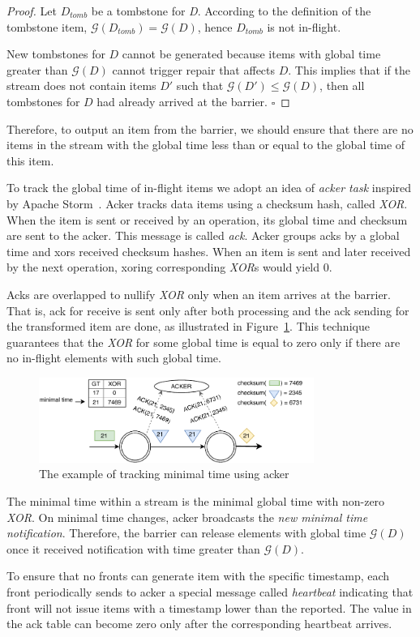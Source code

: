 \begin{proof}
  Let $D_{tomb}$ be a tombstone for {\it D}. According to the definition of the tombstone item, $\mathcal{G} (D_{tomb}) = \mathcal{G} (D)$, hence $D_{tomb}$ is not in-flight.
  
  New tombstones for $D$ cannot be generated because items with global time greater than $\mathcal{G} (D)$ cannot trigger repair that affects $D$. This implies that if the stream does not contain items $D\prime$ such that $\mathcal{G} (D\prime) \le \mathcal{G} (D)$, then all tombstones for $D$ had already arrived at the barrier. $\square$
\end{proof}

Therefore, to output an item from the barrier, we should ensure that there are no items in the stream with the global time less than or equal to the global time of this item.

To track the global time of in-flight items we adopt an idea of {\it acker task} inspired by Apache Storm~\cite{apache:storm}. Acker tracks data items using a checksum hash, called {\it XOR}. When the item is sent or received by an operation, its global time and checksum are sent to the acker. This message is called {\it ack}. Acker groups acks by a global time and xors received checksum hashes. When an item is sent and later received by the next operation, xoring corresponding {\it XOR}s would yield 0.

Acks are overlapped to nullify {\it XOR} only when an item arrives at the barrier. That is, ack for receive is sent only after both processing and the ack sending for the transformed item are done, as illustrated in Figure~\ref{acker}. This technique guarantees that the {\it XOR} for some global time is equal to zero only if there are no in-flight elements with such global time.

\begin{figure}[ht]
  \centering
  \includegraphics[width=0.8\textwidth]{pics/acker}
  \caption{The example of tracking minimal time using acker}
  \label {acker}
\end{figure}

The minimal time within a stream is the minimal global time with non-zero {\it XOR}. On minimal time changes, acker broadcasts the {\it new minimal time notification}. Therefore, the barrier can release elements with global time $\mathcal{G} (D)$ once it received notification with time greater than $\mathcal{G} (D)$.

To ensure that no fronts can generate item with the specific timestamp, each front periodically sends to acker a special message called {\it heartbeat} indicating that front will not issue items with a timestamp lower than the reported. The value in the ack table can become zero only after the corresponding heartbeat arrives.
